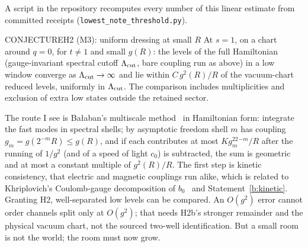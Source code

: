A script in the repository recomputes every number of this linear estimate from committed receipts
(\texttt{lowest\_note\_threshold.py}).

\begin{claim}{CONJECTURE}{H2 (M3): uniform dressing at small $R$}\label{b:m3}
At $s=1$, on a chart around $q=0$, for $t\ne1$ and small $g(R)$: the levels of the full Hamiltonian (gauge-invariant
spectral cutoff $\Lambda_{\rm cut}$, bare coupling run as above) in a low window converge as $\Lambda_{\rm cut}\to\infty$
and lie within $C\,g^2(R)/R$ of the vacuum-chart reduced levels, uniformly in $\Lambda_{\rm cut}$.
The comparison includes multiplicities and exclusion of extra low states outside the retained sector.
\end{claim}

The route I see is Ba{\l}aban's multiscale method~\cite{Balaban} in Hamiltonian form: integrate the fast modes in
spectral shells; by asymptotic freedom shell $m$ has coupling $g_m=g(2^{-m}R)\le g(R)$, and if each contributes at most
$Kg_m^22^{-m}/R$ after the running of $1/g^2$ (and of a speed of light $c_0$) is subtracted, the sum is geometric and at
most a constant multiple of $g^2(R)/R$. The first step is kinetic consistency, that electric and magnetic couplings run alike, which is
related to Khriplovich's Coulomb-gauge decomposition of $b_0$~\cite{Khriplovich69} and Statement~\ref{b:kinetic}. Granting
H2, well-separated low levels can be compared. An $O(g^2)$ error cannot order channels split only at $O(g^2)$;
that needs H2b's stronger remainder and the physical vacuum chart, not the sourced two-well identification.
But a small room is not the world; the room must now grow.
